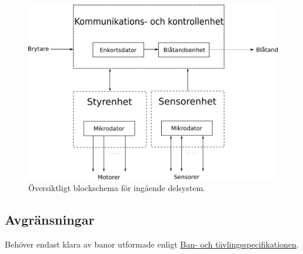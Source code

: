 \documentclass[a4paper,11pt]{article}
\newcommand{\CourseSpecUrl}{https://docs.google.com/document/d/1hnHsI6WGyKorMat25x1FAQ9RA_gEzG-Wgb9o5-Dw_AI/edit?usp=sharing}
\newcommand{\CourseSpecRef}{\href{\CourseSpecUrl}{Ban- och tävlingsspecifikationen}}
\begin{document}
\begin{figure}[h!]
    \centering
    \includegraphics[scale=1]{modules.png}
    \caption{Översiktligt blockschema för ingående delsystem.}
    \label{fig:all_subsystems}
\end{figure}

\subsection{Avgränsningar}
Behöver endast klara av banor utformade enligt \CourseSpecRef. 
\end{document}
